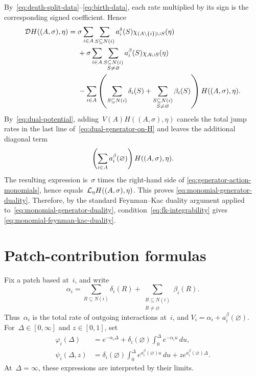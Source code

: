 \documentclass[EJP,preprint,NODS,nobera]{ejpecp}
\begin{document}
By~\eqref{eq:death-split-data}--\eqref{eq:birth-data}, each rate multiplied by
its sign is the corresponding signed coefficient. Hence
\begin{equation}
\label{eq:dual-generator-on-H}
\begin{aligned}
\mathcal{D} H((A,\sigma),\eta)
={}&
\sigma
\sum_{i\in A}\sum_{S\subseteq N(i)}
a_i^\delta(S)
\chi_{\left(A\setminus\left\{i\right\}\right)\cup S}(\eta)
\\
&+
\sigma
\sum_{i\in A}
\sum_{\substack{S\subseteq N(i)\\S\neq\varnothing}}
a_i^\beta(S)
\chi_{A\cup S}(\eta)
\\
&-
\sum_{i\in A}
\left(
\sum_{S\subseteq N(i)}\delta_i(S)
+
\sum_{\substack{S\subseteq N(i)\\S\neq\varnothing}}\beta_i(S)
\right)H((A,\sigma),\eta).
\end{aligned}
\end{equation}
By~\eqref{eq:dual-potential}, adding~$V(A)H((A,\sigma),\eta)$ cancels the
total jump rates in the last line of~\eqref{eq:dual-generator-on-H} and leaves
the additional diagonal term
\begin{equation*}
\left(\sum_{i\in A}a_i^\beta(\varnothing)\right)H((A,\sigma),\eta).
\end{equation*}
The resulting expression is~$\sigma$ times the right-hand side of
\eqref{eq:generator-action-monomials}, hence equals~$\mathcal{L}_\eta H((A,\sigma),\eta)$. This proves
\eqref{eq:monomial-generator-duality}. Therefore, by the standard Feynman--Kac duality argument applied to~\eqref{eq:monomial-generator-duality}, condition~\eqref{eq:fk-integrability} gives
\eqref{eq:monomial-feynman-kac-duality}.


\section{Patch-contribution formulas}
\label{app:contribution-formulas}

Fix a patch based at~$i$, and write
\begin{equation*}
\alpha_i
=
\sum_{R\subseteq N(i)}\delta_i(R)
+
\sum_{\substack{R\subseteq N(i)\\R\neq\varnothing}}\beta_i(R).
\end{equation*}
Thus~$\alpha_i$ is the total rate of outgoing interactions at~$i$, and
$V_i=\alpha_i+a_i^\beta(\varnothing)$. For~$\Delta\in[0,\infty]$ and
$z\in[0,1]$, set
\begin{align}
\varphi_i(\Delta)
&=
e^{-\alpha_i\Delta}
+
\delta_i(\varnothing)
\int_0^\Delta e^{-\alpha_i u}\,du,
\label{eq:patch-phi}
\\
\psi_i(\Delta,z)
&=
\delta_i(\varnothing)
\int_0^\Delta e^{a_i^\beta(\varnothing)u}\,du
+
z e^{a_i^\beta(\varnothing)\Delta}.
\label{eq:patch-psi}
\end{align}
At~$\Delta=\infty$, these expressions are interpreted by their limits.
\end{document}
